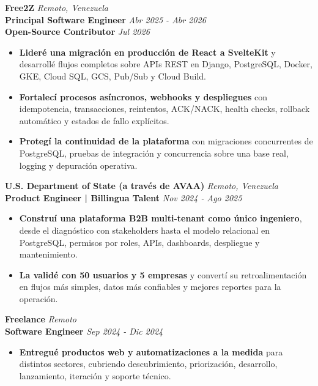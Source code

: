 \documentclass[10pt]{article}
\begin{document}
\vspace{2pt}
\textbf{Free2Z} \hfill \textit{Remoto, Venezuela} \\
\textbf{Principal Software Engineer} \hfill \textit{Abr 2025 - Abr 2026} \\
\textbf{Open-Source Contributor} \hfill \textit{Jul 2026}
\begin{itemize}
    \item \textbf{Lideré una migración en producción de React a SvelteKit} y desarrollé flujos completos sobre APIs REST en Django, PostgreSQL, Docker, GKE, Cloud SQL, GCS, Pub/Sub y Cloud Build.
    \item \textbf{Fortalecí procesos asíncronos, webhooks y despliegues} con idempotencia, transacciones, reintentos, ACK/NACK, health checks, rollback automático y estados de fallo explícitos.
    \item \textbf{Protegí la continuidad de la plataforma} con migraciones concurrentes de PostgreSQL, pruebas de integración y concurrencia sobre una base real, logging y depuración operativa.
\end{itemize}

\vspace{2pt}
\textbf{U.S. Department of State (a través de AVAA)} \hfill \textit{Remoto, Venezuela} \\
\textbf{Product Engineer | Billingua Talent} \hfill \textit{Nov 2024 - Ago 2025}
\begin{itemize}
    \item \textbf{Construí una plataforma B2B multi-tenant como único ingeniero}, desde el diagnóstico con stakeholders hasta el modelo relacional en PostgreSQL, permisos por roles, APIs, dashboards, despliegue y mantenimiento.
    \item \textbf{La validé con 50 usuarios y 5 empresas} y convertí su retroalimentación en flujos más simples, datos más confiables y mejores reportes para la operación.
\end{itemize}

\vspace{2pt}
\textbf{Freelance} \hfill \textit{Remoto} \\
\textbf{Software Engineer} \hfill \textit{Sep 2024 - Dic 2024}
\begin{itemize}
    \item \textbf{Entregué productos web y automatizaciones a la medida} para distintos sectores, cubriendo descubrimiento, priorización, desarrollo, lanzamiento, iteración y soporte técnico.
\end{itemize}
\end{document}
